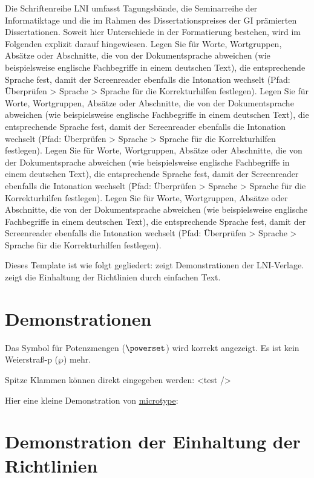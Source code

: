 \documentclass[utf8,biblatex]{lni}
\begin{document}
Die Schriftenreihe LNI umfasst Tagungsbände, die Seminarreihe der Informatiktage und die im Rahmen des Dissertationspreises der GI prämierten Dissertationen. Soweit hier Unterschiede in der Formatierung bestehen, wird im Folgenden explizit darauf hingewiesen. Legen Sie für Worte, Wortgruppen, Absätze oder Abschnitte, die von der Dokumentsprache abweichen (wie beispielsweise englische Fachbegriffe in einem deutschen Text), die entsprechende Sprache fest, damit der Screenreader ebenfalls die Intonation wechselt (Pfad: Überprüfen > Sprache > Sprache für die Korrekturhilfen festlegen). Legen Sie für Worte, Wortgruppen, Absätze oder Abschnitte, die von der Dokumentsprache abweichen (wie beispielsweise englische Fachbegriffe in einem deutschen Text), die entsprechende Sprache fest, damit der Screenreader ebenfalls die Intonation wechselt (Pfad: Überprüfen > Sprache > Sprache für die Korrekturhilfen festlegen). Legen Sie für Worte, Wortgruppen, Absätze oder Abschnitte, die von der Dokumentsprache abweichen (wie beispielsweise englische Fachbegriffe in einem deutschen Text), die entsprechende Sprache fest, damit der Screenreader ebenfalls die Intonation wechselt (Pfad: Überprüfen > Sprache > Sprache für die Korrekturhilfen festlegen). Legen Sie für Worte, Wortgruppen, Absätze oder Abschnitte, die von der Dokumentsprache abweichen (wie beispielsweise englische Fachbegriffe in einem deutschen Text), die entsprechende Sprache fest, damit der Screenreader ebenfalls die Intonation wechselt (Pfad: Überprüfen > Sprache > Sprache für die Korrekturhilfen festlegen).


Dieses Template ist wie folgt gegliedert:
 zeigt Demonstrationen der LNI-Verlage.
 zeigt die Einhaltung der Richtlinien durch einfachen Text.

\section{Demonstrationen}
\label{sec:demos}
Das Symbol für Potenzmengen ($\powerset$) wird korrekt angezeigt.
Es ist kein Weierstraß-p ($\wp$) mehr.

Spitze Klammen können direkt eingegeben werden: <test />

Hier eine kleine Demonstration von \href{https://www.ctan.org/pkg/microtype}{microtype}:
\blindtext

\section{Demonstration der Einhaltung der Richtlinien}
\label{sec:lniconformance}
\end{document}

